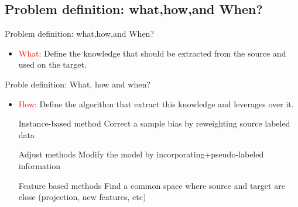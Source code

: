 \documentclass{beamer}
\begin{document}
\subsection{Problem definition: what,how,and When?}
\begin{frame}{Problem definition: what,how,and When?}

\begin{itemize}
\item \textcolor{red}{What}: Define the knowledge that should be extracted from the
source and used on the target.
\begin{figure}
 \centering
{}
    
\end{figure}

\end{itemize}
\end{frame}

\begin{frame}{Proble definition: What, how and when?}

\begin{itemize}

\item \textcolor{red}{How}: Define the algorithm that extract this knowledge and
leverages over it.
\begin{block}{Instance-based method}
Correct a sample bias by reweighting source labeled data
\end{block}
\begin{block}{Adjust methods}
Modify the model by incorporating+pseudo-labeled information
\end{block}
\begin{block}{Feature based methods}
Find a common space where source and target are close
(projection, new features, etc)
\end{block}

\end{itemize}
\end{frame}
\end{document}
